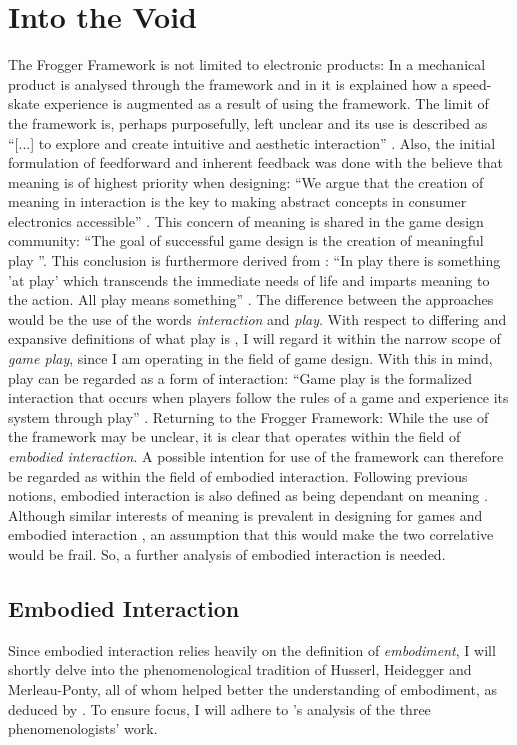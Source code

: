 \section{Into the Void}
The Frogger Framework is not limited to electronic products: In  a mechanical product is analysed through the framework and in  it is explained how a speed-skate experience is augmented as a result of using the framework. The limit of the framework is, perhaps purposefully, left unclear and its use is described as ``[...] to explore and create intuitive and aesthetic interaction'' \cite[p. 22]{transbehav}. Also, the initial formulation of feedforward and inherent feedback was done with the believe that meaning is of highest priority when designing: ``We argue that the creation of meaning in interaction is the key to making abstract concepts in consumer electronics accessible'' \cite[p. 2]{howdonald}. This concern of meaning is shared in the game design community: ``The goal of successful game design is the creation of meaningful play ''\cite[ch. 3, p. 3]{salen}. This conclusion is furthermore derived from \cite{huizinga}: ``In play there is something 'at play' which transcends the immediate needs of life and imparts meaning to the action. All play means something'' \cite[p. 1]{huizinga}. The difference between the approaches would be the use of the words \textit{interaction} and \textit{play}. With respect to differing and expansive definitions of what play is \cite{huizinga, sicartplay, salen}, I will regard it within the narrow scope of \textit{game play}, since I am operating in the field of game design. With this in mind, play can be regarded as a form of interaction: ``Game play is the formalized interaction that occurs when players follow the rules of a game and experience its system through play'' \cite[ch. 22, p. 3]{salen}.
Returning to the Frogger Framework: While the use of the framework may be unclear, it is clear that  operates within the field of \textit{embodied interaction}. A possible intention for use of the framework can therefore be regarded as within the field of embodied interaction. Following previous notions, embodied interaction is also defined as being dependant on meaning \cite[p. 126]{dourish}. Although similar interests of meaning is prevalent in designing for games \cite{salen} and embodied interaction \cite{dourish}, an assumption that this would make the two correlative would be frail. So, a further analysis of embodied interaction is needed.

\subsection{Embodied Interaction}
Since embodied interaction relies heavily on the definition of \textit{embodiment}, I will shortly delve into the phenomenological tradition of Husserl, Heidegger and Merleau-Ponty, all of whom helped better the understanding of embodiment, as deduced by . To ensure focus, I will adhere to \citeauthor{dourish}'s \citeyear{dourish} analysis of the three phenomenologists' work.

